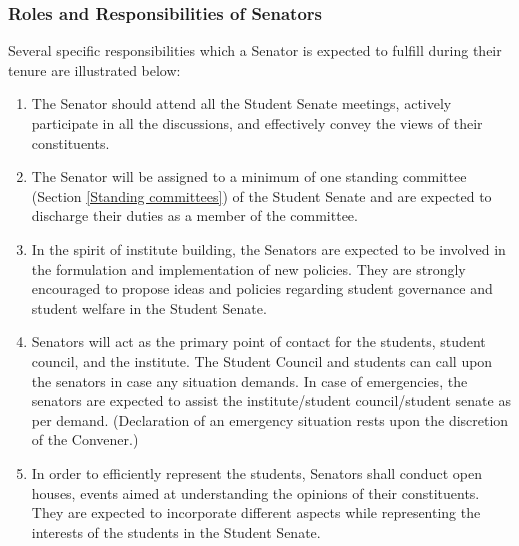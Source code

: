 \documentclass[12pt]{article}
\begin{document}
\subsubsection{Roles and Responsibilities of Senators}
Several specific responsibilities which a Senator is expected to fulfill during their tenure are illustrated below:
\begin{enumerate}
    \item The Senator should attend all the Student Senate meetings, actively participate in all the discussions, and effectively convey the views of their constituents.
    \item The Senator will be assigned to a minimum of one standing committee (Section \ref{Standing committees}) of the Student Senate and are expected to discharge their duties as a member of the committee.
    \item In the spirit of institute building, the Senators are expected to be involved in the formulation and implementation of new policies. They are strongly encouraged to propose ideas and policies regarding student governance and student welfare in the Student Senate. 
    \item Senators will act as the primary point of contact for the students, student council, and the institute. The Student Council and students can call upon the senators in case any situation demands. In case of emergencies, the senators are expected to assist the institute/student council/student senate as per demand. (Declaration of an emergency situation rests upon the discretion of the Convener.)
    \item In order to efficiently represent the students, Senators shall conduct open houses, events aimed at understanding the opinions of their constituents. They are expected to incorporate different aspects while representing the interests of the students in the Student Senate.
\end{enumerate}
\end{document}
